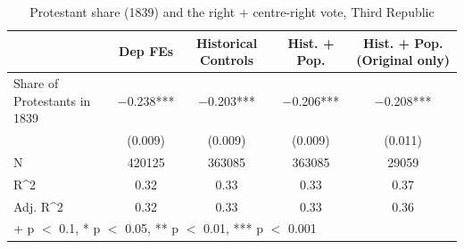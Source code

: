 \begin{table}
\centering
\caption{Protestant share (1839) and the right + centre-right vote, Third Republic}
\centering
\begin{tabular}[t]{lcccc}
\toprule
  & Dep FEs & Historical Controls & Hist. + Pop. & Hist. + Pop. (Original only)\\
\midrule
Share of Protestants in 1839 & \num{-0.238}*** & \num{-0.203}*** & \num{-0.206}*** & \num{-0.208}***\\
 & (\num{0.009}) & (\num{0.009}) & (\num{0.009}) & (\num{0.011})\\
\midrule
N & \num{420125} & \num{363085} & \num{363085} & \num{29059}\\
R\textasciicircum{}2 & \num{0.32} & \num{0.33} & \num{0.33} & \num{0.37}\\
Adj. R\textasciicircum{}2 & \num{0.32} & \num{0.33} & \num{0.33} & \num{0.36}\\
\bottomrule
\multicolumn{5}{l}{\rule{0pt}{1em}+ p $<$ 0.1, * p $<$ 0.05, ** p $<$ 0.01, *** p $<$ 0.001}\\
\end{tabular}
\end{table}
